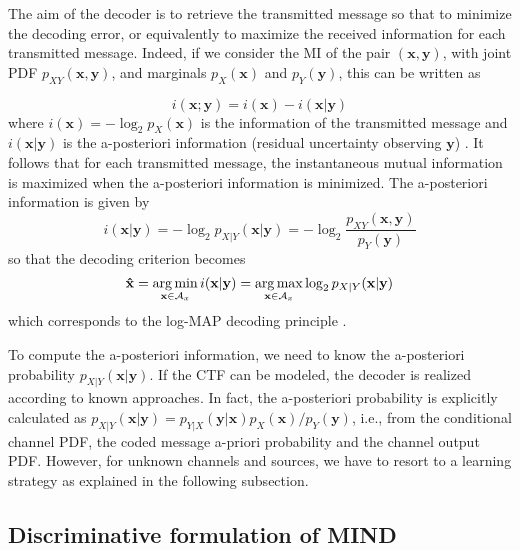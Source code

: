 The aim of the decoder is to retrieve the transmitted message so that to minimize the decoding error, or equivalently to maximize the received information for each transmitted message. Indeed, if we consider the MI of the pair $(\mathbf{x},\mathbf{y})$, with joint PDF $p_{XY}(\mathbf{x},\mathbf{y})$, and marginals $p_X(\mathbf{x})$ and $p_Y(\mathbf{y})$, this can be written as

\begin{equation}
i(\mathbf{x};\mathbf{y})=i(\mathbf{x})-i(\mathbf{x}|\mathbf{y})
\end{equation}
where $i(\mathbf{x}) = -\log_2 p_{X}(\mathbf{x})$ is the information of the transmitted message and $i(\mathbf{x}|\mathbf{y})$ is the a-posteriori information (residual uncertainty observing $\mathbf{y}$) \cite{Gallager1968}. It follows that for each transmitted message, the instantaneous mutual information is maximized when the a-posteriori information is minimized. The a-posteriori information is given by
\begin{equation}
\label{eq:MIND_PI}
i(\mathbf{x}|\mathbf{y})=-\log_2 p_{X|Y}(\mathbf{x}|\mathbf{y}) = -\log_2{\frac{p_{XY}(\mathbf{x},\mathbf{y})}{p_{Y}(\mathbf{y})}}
\end{equation}
so that the decoding criterion becomes
\begin{equation}
\mathbf{\hat{x}}=\operatorname*{arg\,min}_{\mathbf{x}\in \mathcal{A}_x}{i(\mathbf{x}|\mathbf{y})} = \operatorname*{arg\,max}_{\mathbf{x}\in \mathcal{A}_x}{\log_2 p_{X|Y}(\mathbf{x}|\mathbf{y})}
\end{equation}
which corresponds to the log-MAP decoding principle \cite{Proakis2001,Bahl1974}.

To compute the a-posteriori information, we need to know the a-posteriori probability $p_{X|Y}(\mathbf{x}|\mathbf{y})$. If the CTF can be modeled, the decoder is realized according to known approaches. In fact, the a-posteriori probability is explicitly calculated as $p_{X|Y}(\mathbf{x}|\mathbf{y})=p_{Y|X}(\mathbf{y}|\mathbf{x})p_{X}(\mathbf{x})/p_Y(\mathbf{y})$, i.e., from the conditional channel PDF, the coded message a-priori probability and the channel output PDF. However, for unknown channels and sources, we have to resort to a learning strategy as explained in the following subsection.

\subsection{Discriminative formulation of MIND}
\label{subsec:mind_ndec}

